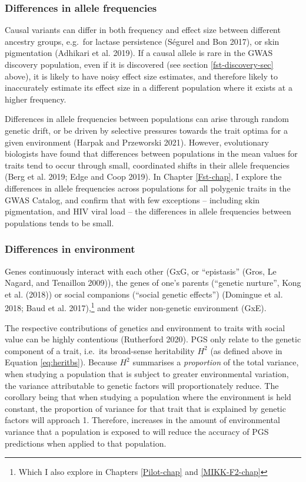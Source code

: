 \documentclass[
]{book}
\begin{document}
\hypertarget{differences-in-allele-frequencies}{%
\subsubsection{Differences in allele frequencies}\label{differences-in-allele-frequencies}}

Causal variants can differ in both frequency and effect size between different ancestry groups, e.g.~for lactase persistence (Ségurel and Bon 2017), or skin pigmentation (Adhikari et al. 2019). If a causal allele is rare in the GWAS discovery population, even if it is discovered (see section \ref{fst-discovery-sec} above), it is likely to have noisy effect size estimates, and therefore likely to inaccurately estimate its effect size in a different population where it exists at a higher frequency.

Differences in allele frequencies between populations can arise through random genetic drift, or be driven by selective pressures towards the trait optima for a given environment (Harpak and Przeworski 2021). However, evolutionary biologists have found that differences between populations in the mean values for traits tend to occur through small, coordinated shifts in their allele frequencies (Berg et al. 2019; Edge and Coop 2019). In Chapter \ref{Fst-chap}, I explore the differences in allele frequencies across populations for all polygenic traits in the GWAS Catalog, and confirm that with few exceptions -- including skin pigmentation, and HIV viral load -- the differences in allele frequencies between populations tends to be small.

\hypertarget{fst-env-sec}{%
\subsubsection{Differences in environment}\label{fst-env-sec}}

Genes continuously interact with each other (GxG, or ``epistasis'' (Gros, Le Nagard, and Tenaillon 2009)), the genes of one's parents (``genetic nurture'', Kong et al. (2018)) or social companions (``social genetic effects'') (Domingue et al. 2018; Baud et al. 2017),\footnote{Which I also explore in Chapters \ref{Pilot-chap} and \ref{MIKK-F2-chap}} and the wider non-genetic environment (GxE).

The respective contributions of genetics and environment to traits with social value can be highly contentious (Rutherford 2020). PGS only relate to the genetic component of a trait, i.e.~its broad-sense heritability \(H^2\) (as defined above in Equation \eqref{eq:heritbs}). Because \(H^2\) summarises a \emph{proportion} of the total variance, when studying a population that is subject to greater environmental variation, the variance attributable to genetic factors will proportionately reduce. The corollary being that when studying a population where the environment is held constant, the proportion of variance for that trait that is explained by genetic factors will approach 1. Therefore, increases in the amount of environmental variance that a population is exposed to will reduce the accuracy of PGS predictions when applied to that population.
\end{document}
